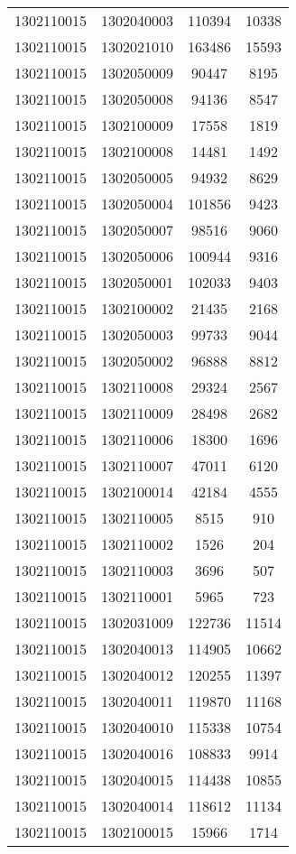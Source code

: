 \begin{longtable}[h]{llcc}
		1302110015 & 1302040003 & 110394 & 10338\\
		1302110015 & 1302021010 & 163486 & 15593\\
		1302110015 & 1302050009 & 90447 & 8195\\
		1302110015 & 1302050008 & 94136 & 8547\\
		1302110015 & 1302100009 & 17558 & 1819\\
		1302110015 & 1302100008 & 14481 & 1492\\
		1302110015 & 1302050005 & 94932 & 8629\\
		1302110015 & 1302050004 & 101856 & 9423\\
		1302110015 & 1302050007 & 98516 & 9060\\
		1302110015 & 1302050006 & 100944 & 9316\\
		1302110015 & 1302050001 & 102033 & 9403\\
		1302110015 & 1302100002 & 21435 & 2168\\
		1302110015 & 1302050003 & 99733 & 9044\\
		1302110015 & 1302050002 & 96888 & 8812\\
		1302110015 & 1302110008 & 29324 & 2567\\
		1302110015 & 1302110009 & 28498 & 2682\\
		1302110015 & 1302110006 & 18300 & 1696\\
		1302110015 & 1302110007 & 47011 & 6120\\
		1302110015 & 1302100014 & 42184 & 4555\\
		1302110015 & 1302110005 & 8515 & 910\\
		1302110015 & 1302110002 & 1526 & 204\\
		1302110015 & 1302110003 & 3696 & 507\\
		1302110015 & 1302110001 & 5965 & 723\\
		1302110015 & 1302031009 & 122736 & 11514\\
		1302110015 & 1302040013 & 114905 & 10662\\
		1302110015 & 1302040012 & 120255 & 11397\\
		1302110015 & 1302040011 & 119870 & 11168\\
		1302110015 & 1302040010 & 115338 & 10754\\
		1302110015 & 1302040016 & 108833 & 9914\\
		1302110015 & 1302040015 & 114438 & 10855\\
		1302110015 & 1302040014 & 118612 & 11134\\
		1302110015 & 1302100015 & 15966 & 1714\\

\end{longtable}
